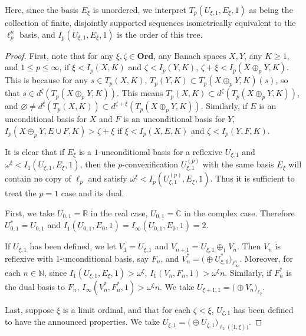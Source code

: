 \documentclass[12pt]{amsart}
\theoremstyle{definition}
\newcommand{\ord}{\textbf{Ord}}
\newcommand{\nn}{\mathbb{N}}
\begin{document}
Here, since the basis $E_\xi$ is unordered, we interpret $T_p(U_{\xi,1}, E_\xi, 1)$ as being the collection of finite, disjointly supported sequences isometrically equivalent to the $\ell_p^n$ basis, and $I_p(U_{\xi, 1}, E_\xi, 1)$ is the order of this tree.  


\begin{proof} First, note that for any $\xi, \zeta\in \ord$, any Banach spaces $X,Y$, any $K\geqslant 1$, and $1\leqslant p\leqslant \infty$, if $\xi<I_p(X,K)$ and $\zeta<I_p(Y, K)$, $\zeta+\xi<I_p(X\oplus_p Y, K)$.  This is because for any $s\in T_p(X, K)$, $T_p(Y, K)\subset T_p(X\oplus_p Y, K)(s)$, so that $s\in d^\zeta(T_p(X\oplus_p Y, K))$.  This means $T_p(X, K)\subset d^\zeta(T_p(X\oplus_p Y, K))$, and $\varnothing \neq d^\xi(T_p(X, K))\subset d^{\zeta+\xi}(T_p(X\oplus_p Y, K)) $. Similarly, if $E$ is an unconditional basis for $X$ and $F$ is an unconditional basis for $Y$, $I_p(X\oplus_p Y, E\cup F, K)>\zeta+\xi$ if $\xi<I_p(X, E, K)$ and $\zeta<I_p(Y, F, K)$.   


It is clear that if $E_\xi$ is a $1$-unconditional basis for a reflexive $U_{\xi,1}$ and $\omega^\xi<I_1(U_{\xi,1}, E_\xi, 1)$, then the $p$-convexification $U^{(p)}_{\xi,1}$ with the same basis $E_\xi$ will contain no copy of $\ell_p$ and satisfy $\omega^\xi<I_p(U_{\xi,1}^{(p)}, E_\xi, 1)$.  Thus it is sufficient to treat the $p=1$ case and its dual. 

First, we take $U_{0,1}= \mathbb{R}$ in the real case, $U_{0,1}=\mathbb{C}$ in the complex case. Therefore $U_{0,1}^*=U_{0,1}$ and $I_1(U_{0,1}, E_0,1)=I_\infty(U_{0,1}, E_0,1)=2$.      

If $U_{\xi,1}$ has been defined, we let $V_1= U_{\xi,1}$ and $V_{n+1}= U_{\xi,1}\oplus_1 V_n$.  Then $V_n$ is reflexive with $1$-unconditional basis, say $F_n$, and $V_n^*=\bigl(\oplus U^*_{\xi,1}\bigr)_{\ell_\infty^n}$.  Moreover, for each $n\in \nn$, since $I_1(U_{\xi,1}, E_\xi  ,1)>\omega^\xi$, $I_1(V_n, F_n, 1)>\omega^\xi n$.  Similarly, if $F_n^*$ is the dual basis to $F_n$, $I_\infty(V_n^*, F_n^*, 1)>\omega^\xi n$.  We take $U_{\xi+1,1}=\bigl(\oplus V_n\bigr)_{\ell_2}$.  

Last, suppose $\xi$ is a limit ordinal, and that for each $\zeta<\xi$, $U_{\zeta,1}$ has been defined to have the announced properties.  We take $U_{\xi,1} = \bigl(\oplus U_{\zeta,1}\bigr)_{\ell_2([1, \xi))}$.  


\end{proof}
\end{document}
